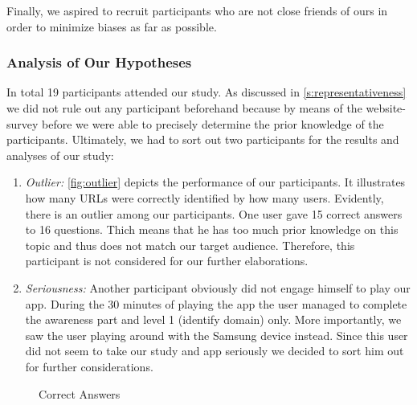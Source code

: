 Finally, we aspired to recruit participants who are not close friends of ours in order to minimize biases as far as possible.
\subsubsection{Analysis of Our Hypotheses}
\label{s:hypanalysis}
In total 19 participants attended our study.
As discussed in \autoref{s:representativeness} we did not rule out any participant beforehand because by means of the website-survey before we were able to precisely determine the prior knowledge of the participants.
Ultimately, we had to sort out two participants for the results and analyses of our study:

\begin{enumerate}
	\item\textit{Outlier:} \autoref{fig:outlier} depicts the performance of our participants.
	It illustrates how many URLs were correctly identified by how many users.
	Evidently, there is an outlier among our participants. 
	One user gave 15 correct answers to 16 questions.
	Thich means that he has too much prior knowledge on this topic and thus does not match our target audience.
	Therefore, this participant is not considered for our further elaborations.
	\item\textit{Seriousness:} Another participant obviously did not engage himself to play our app.
	During the 30 minutes of playing the app the user managed to complete the awareness part and level 1 (identify domain) only.
	More importantly, we saw the user playing around with the Samsung device instead.
	Since this user did not seem to take our study and app seriously we decided to sort him out for further considerations.
\end{enumerate}

\begin{figure}
\centering
{}
\caption{Correct Answers}
\label{fig:hyp1results}
\end{figure}

